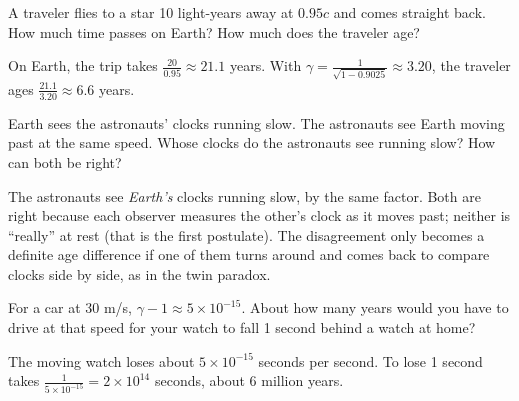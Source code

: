 \begin{Exercise}[title={A Longer Trip}, label=sr_twins]
A traveler flies to a star 10 light-years away at $0.95c$ and comes straight back. How much time
passes on Earth? How much does the traveler age?
\end{Exercise}
\begin{Answer}[ref=sr_twins]
On Earth, the trip takes $\frac{20}{0.95} \approx 21.1$ years. With
$\gamma = \frac{1}{\sqrt{1 - 0.9025}} \approx 3.20$, the traveler ages $\frac{21.1}{3.20} \approx 6.6$ years.
\end{Answer}

\begin{Exercise}[title={Who Is Slow?}, label=sr_symmetric]
Earth sees the astronauts' clocks running slow. The astronauts see Earth moving past at the same speed.
Whose clocks do the astronauts see running slow? How can both be right?
\end{Exercise}
\begin{Answer}[ref=sr_symmetric]
The astronauts see \emph{Earth's} clocks running slow, by the same factor. Both are right because
each observer measures the other's clock as it moves past; neither is ``really'' at rest (that is the
first postulate). The disagreement only becomes a definite age difference if one of them turns around
and comes back to compare clocks side by side, as in the twin paradox.
\end{Answer}

\begin{Exercise}[title={Highway Relativity}, label=sr_highway]
For a car at 30 m/s, $\gamma - 1 \approx 5 \times 10^{-15}$. About how many years would you have to
drive at that speed for your watch to fall 1 second behind a watch at home?
\end{Exercise}
\begin{Answer}[ref=sr_highway]
The moving watch loses about $5 \times 10^{-15}$ seconds per second. To lose 1 second takes
$\frac{1}{5 \times 10^{-15}} = 2 \times 10^{14}$ seconds, about 6 million years.
\end{Answer}
